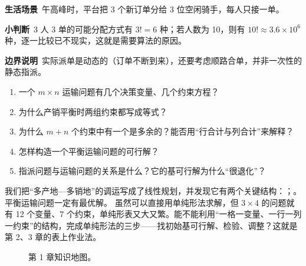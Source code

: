 \begin{lifebox}
\textbf{生活场景}\ 午高峰时，平台把 3 个新订单分给 3 位空闲骑手，每人只接一单。\par
{}
\textbf{小判断}\ 3 人 3 单的可能分配方式有 $3!=6$ 种；若人数为 10，则有 $10!\approx 3.6\times10^6$ 种，逐一比较已不现实，这就是需要算法的原因。\par
\textbf{边界说明}\ 实际派单是动态的（订单不断到来），还要考虑顺路合单，并非一次性的静态指派。
\end{lifebox}

\begin{checkbox}
\begin{enumerate}[label=\arabic*.]
\item 一个 $m\times n$ 运输问题有几个决策变量、几个约束方程？
\item 为什么产销平衡时两组约束都写成等式？
\item 为什么 $m+n$ 个约束中有一个是多余的？能否用“行合计与列合计”来解释？
\item 怎样构造一个平衡运输问题的可行解？
\item 指派问题与运输问题的关系是什么？它的基可行解为什么“很退化”？
\end{enumerate}
\end{checkbox}

\solved
我们把“多产地—多销地”的调运写成了线性规划，并发现它有两个关键结构：；。平衡运输问题一定有最优解。
\nextq
虽然可以直接用单纯形法求解，但 $3\times4$ 的问题就有 12 个变量、7 个约束，单纯形表又大又繁。能不能利用“一格一变量、一行一列一约束”的结构，完成单纯形法的三步——找初始基可行解、检验、调整？这就是第 2、3 章的表上作业法。

\begin{figure}[H]
\centering
{}
\caption{第 1 章知识地图。}
\end{figure}
